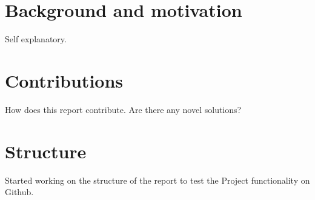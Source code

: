 \section*{Background and motivation}
Self explanatory. 
\section*{Contributions}
How does this report contribute. Are there any novel solutions?
\section*{Structure}
Started working on the structure of the report to test the Project functionality on Github. 